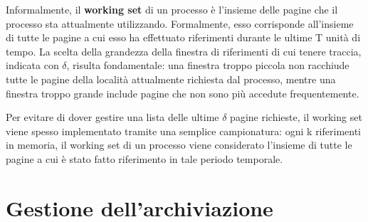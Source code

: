 \documentclass{article}
\begin{document}
Informalmente, il \textbf{working set} di un processo è l'insieme delle pagine che il processo sta attualmente utilizzando. Formalmente, esso corrisponde all'insieme di tutte le pagine a cui esso ha effettuato riferimenti durante le ultime T unità di tempo.
La scelta della grandezza della finestra di riferimenti di cui tenere traccia, indicata con $\delta$, risulta fondamentale: una finestra troppo piccola non racchiude tutte le pagine della località attualmente richiesta dal processo, mentre una finestra troppo grande include pagine che non sono più accedute frequentemente.\par
Per evitare di dover gestire una lista delle ultime $\delta$ pagine richieste, il working set viene spesso implementato tramite una semplice campionatura: ogni k riferimenti in memoria, il working set di un processo viene considerato l'insieme di tutte le pagine a cui è stato fatto riferimento in tale periodo temporale.

\pagebreak
\section{Gestione dell'archiviazione}
\end{document}
